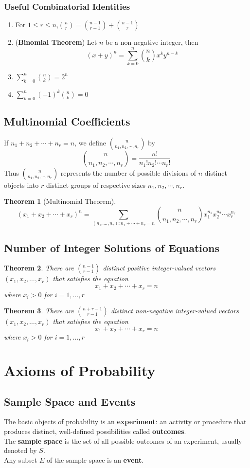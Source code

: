 \documentclass[12pt]{article}
\newtheorem{theorem}{Theorem}[section]
\theoremstyle{definition}
\begin{document}
\subsubsection{Useful Combinatorial Identities}
\begin{enumerate}
\item For $1\leq r\leq n$,$\binom{n}{r}=\binom{n-1}{r-1}+\binom{n-1}{r}$
\item (\textbf{Binomial Theorem}) Let $n$ be a non-negative integer, then
\[
(x+y)^n=\sum_{k=0}^{n}\binom{n}{k}x^k y^{n-k}
\]
\item $\sum_{k=0}^{n}\binom{n}{k}=2^n$
\item $\sum_{k=0}^{n}(-1)^k\binom{n}{k}=0$
\end{enumerate}
\subsection{Multinomial Coefficients}
If $n_1+n_2+\cdots+n_r=n$, we define $\binom{n}{n_1,n_2,\cdots,n_r}$ by
\[
\binom{n}{n_1,n_2,\cdots,n_r}=\frac{n!}{n_1!n_2!\cdots n_r!}
\]
Thus $\binom{n}{n_1,n_2,\cdots,n_r}$ represents the number of possible divisions of $n$ distinct objects into $r$ distinct groups of respective sizes $n_1, n_2, \cdots, n_r$.
\begin{theorem}[Multinomial Theorem]
\[
(x_1+x_2+\cdots+x_r)^n=\sum_{(n_1,\ldots,n_r):n_1+\cdots+n_r=n}\binom{n}{n_1,n_2,\cdots,n_r}x_1^{n_1}x_2^{n_2}\cdots x_r^{n_r}
\]
\end{theorem}
\subsection{Number of Integer Solutions of Equations}
\begin{theorem}
\normalfont There are $\binom{n-1}{r-1}$ distinct \textit{positive} integer-valued vectors $(x_1,x_2,\ldots,x_r)$ that satisfies the equation
\[
x_1+x_2+\cdots+x_r=n
\]
where $x_i>0$ for $i=1,\ldots, r$
\end{theorem}
\begin{theorem}
\normalfont There are $\binom{n+r-1}{r-1}$ distinct \textit{non-negative} integer-valued vectors $(x_1,x_2,\ldots,x_r)$ that satisfies the equation
\[
x_1+x_2+\cdots+x_r=n
\]
where $x_i>0$ for $i=1,\ldots, r$
\end{theorem}
\section{Axioms of Probability}
\subsection{Sample Space and Events}
The basic objects of probability is an \textbf{experiment}: an activity or procedure that produces distinct, well-defined possibilities called \textbf{outcomes}.\\
The \textbf{sample space} is the set of all possible outcomes of an experiment, usually denoted by $S$.\\
Any subset $E$ of the sample space is an \textbf{event}.
\end{document}
